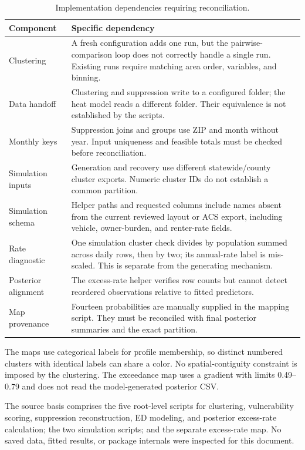 \documentclass[11pt,letterpaper]{article}
\newcommand{\code}[1]{\texttt{\detokenize{#1}}}
\begin{document}
\begin{longtable}{@{}p{}p{}@{}}
\caption{Implementation dependencies requiring reconciliation.}\label{tab:dependencies}\\
\toprule
Component & Specific dependency\\
\midrule
\endhead
Clustering & A fresh configuration adds one run, but the pairwise-comparison loop does not correctly handle a single run. Existing runs require matching area order, variables, and binning.\\
Data handoff & Clustering and suppression write to a configured \code{MIN} folder; the heat model reads a different \code{HEAT_by_cluster} folder. Their equivalence is not established by the scripts.\\
Monthly keys & Suppression joins and groups use ZIP and month without year. Input uniqueness and feasible totals must be checked before reconciliation.\\
Simulation inputs & Generation and recovery use different statewide/county cluster exports. Numeric cluster IDs do not establish a common partition.\\
Simulation schema & Helper paths and requested columns include names absent from the current reviewed layout or ACS export, including vehicle, owner-burden, and renter-rate fields.\\
Rate diagnostic & One simulation cluster check divides by population summed across daily rows, then by two; its annual-rate label is mis-scaled. This is separate from the generating mechanism.\\
Posterior alignment & The excess-rate helper verifies row counts but cannot detect reordered observations relative to fitted predictors.\\
Map provenance & Fourteen probabilities are manually supplied in the mapping script. They must be reconciled with final posterior summaries and the exact partition.\\
\bottomrule
\end{longtable}

The maps use categorical labels for profile membership, so distinct numbered clusters with identical labels can share a color. No spatial-contiguity constraint is imposed by the clustering. The exceedance map uses a gradient with limits 0.49--0.79 and does not read the model-generated posterior CSV.

The source basis comprises the five root-level scripts for clustering, vulnerability scoring, suppression reconstruction, ED modeling, and posterior excess-rate calculation; the two simulation scripts; and the separate excess-rate map. No saved data, fitted results, or package internals were inspected for this document.
\end{document}
